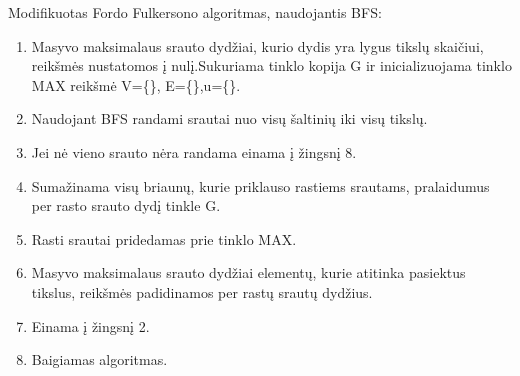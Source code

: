 Modifikuotas Fordo Fulkersono algoritmas, naudojantis BFS:
\begin{enumerate}
	\item Masyvo maksimalaus srauto dydžiai, kurio dydis yra lygus tikslų skaičiui, reikšmės nustatomos į nulį.Sukuriama tinklo kopija G ir inicializuojama tinklo MAX reikšmė {V=\{\}, E=\{\},u=\{\}}.
	\item Naudojant BFS randami srautai nuo visų šaltinių iki visų tikslų.
	\item Jei nė vieno srauto nėra randama einama į žingsnį 8.
	\item Sumažinama visų briaunų, kurie priklauso rastiems srautams, pralaidumus per rasto srauto dydį tinkle G.
	\item Rasti srautai pridedamas prie tinklo MAX.
	\item Masyvo maksimalaus srauto dydžiai elementų, kurie atitinka pasiektus tikslus, reikšmės padidinamos per rastų srautų dydžius.
	\item Einama į žingsnį 2.
	\item Baigiamas algoritmas.
\end{enumerate}